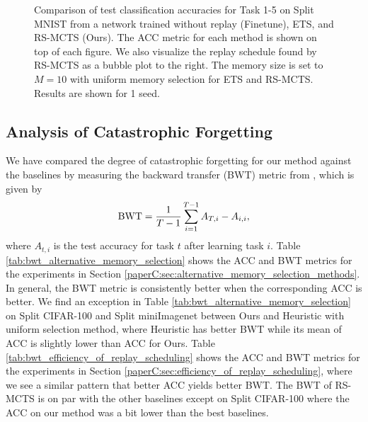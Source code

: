 \begin{figure}[t]
  \centering
  \setlength{\figwidth}{0.27\textwidth}
  \setlength{\figheight}{.15\textheight}
  
  \vspace{-3mm}
  \caption{ Comparison of test classification accuracies for Task 1-5 on Split MNIST from a network trained without replay (Finetune), ETS, and RS-MCTS (Ours). The ACC metric for each method is shown on top of each figure. We also visualize the replay schedule found by RS-MCTS as a bubble plot to the right. The memory size is set to $M=10$ with uniform memory selection for ETS and RS-MCTS. Results are shown for 1 seed. 
  }
  \vspace{-3mm}
  \label{fig:split_mnist_task_accuracies_and_bubble_plot}
\end{figure}

\subsection{Analysis of Catastrophic Forgetting}\label{paperC:app:analysis_of_catastrophic_forgetting}

We have compared the degree of catastrophic forgetting for our method against the baselines by measuring the backward transfer (BWT) metric from , which is given by
\begin{align}
	\textnormal{BWT} = \frac{1}{T-1} \sum_{i=1}^{T-1} A_{T, i} - A_{i, i},
\end{align}
where $A_{t, i}$ is the test accuracy for task $t$ after learning task $i$. Table \ref{tab:bwt_alternative_memory_selection} shows the ACC and BWT metrics for the experiments in Section \ref{paperC:sec:alternative_memory_selection_methods}. In general, the BWT metric is consistently better when the corresponding ACC is better. We find an exception in Table \ref{tab:bwt_alternative_memory_selection} on Split CIFAR-100 and Split miniImagenet between Ours and Heuristic with uniform selection method, where Heuristic has better BWT while its mean of ACC is slightly lower than ACC for Ours. Table \ref{tab:bwt_efficiency_of_replay_scheduling} shows the ACC and BWT metrics for the experiments in Section \ref{paperC:sec:efficiency_of_replay_scheduling}, where we see a similar pattern that better ACC yields better BWT. The BWT of RS-MCTS is on par with the other baselines except on Split CIFAR-100 where the ACC on our method was a bit lower than the best baselines.




